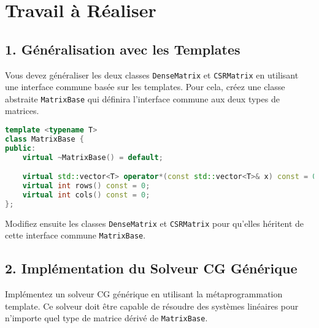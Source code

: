 \documentclass[a4paper,14pt]{article}
\begin{document}
\section*{Travail à Réaliser}

\subsection*{1. Généralisation avec les Templates}

Vous devez généraliser les deux classes \texttt{DenseMatrix} et \texttt{CSRMatrix} en utilisant une interface commune basée sur les templates. Pour cela, créez une classe abstraite \texttt{MatrixBase} qui définira l'interface commune aux deux types de matrices.

\begin{lstlisting}[language=C++]
template <typename T>
class MatrixBase {
public:
    virtual ~MatrixBase() = default;

    virtual std::vector<T> operator*(const std::vector<T>& x) const = 0;
    virtual int rows() const = 0;
    virtual int cols() const = 0;
};
\end{lstlisting}

Modifiez ensuite les classes \texttt{DenseMatrix} et \texttt{CSRMatrix} pour qu'elles héritent de cette interface commune \texttt{MatrixBase}.

\subsection*{2. Implémentation du Solveur CG Générique}

Implémentez un solveur CG générique en utilisant la métaprogrammation template. Ce solveur doit être capable de résoudre des systèmes linéaires pour n'importe quel type de matrice dérivé de \texttt{MatrixBase}.
\end{document}
